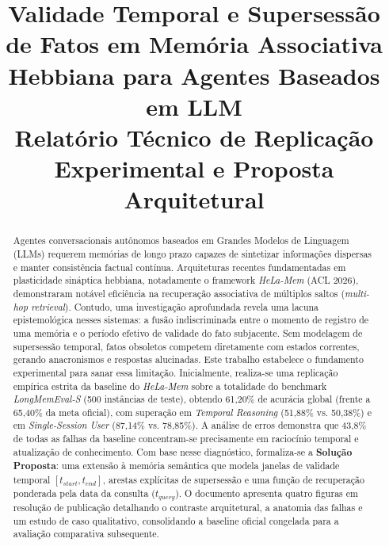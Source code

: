 \documentclass[10pt,conference,twocolumn]{IEEEtran}
\begin{document}
\title{Validade Temporal e Supersessão de Fatos em Memória Associativa Hebbiana para Agentes Baseados em LLM\\
\large Relatório Técnico de Replicação Experimental e Proposta Arquitetural}

\author{
}

\maketitle

\begin{abstract}
Agentes conversacionais autônomos baseados em Grandes Modelos de Linguagem (LLMs) requerem memórias de longo prazo capazes de sintetizar informações dispersas e manter consistência factual contínua. Arquiteturas recentes fundamentadas em plasticidade sináptica hebbiana, notadamente o framework \textit{HeLa-Mem} (ACL 2026), demonstraram notável eficiência na recuperação associativa de múltiplos saltos (\textit{multi-hop retrieval}). Contudo, uma investigação aprofundada revela uma lacuna epistemológica nesses sistemas: a fusão indiscriminada entre o momento de registro de uma memória e o período efetivo de validade do fato subjacente. Sem modelagem de supersessão temporal, fatos obsoletos competem diretamente com estados correntes, gerando anacronismos e respostas alucinadas. Este trabalho estabelece o fundamento experimental para sanar essa limitação. Inicialmente, realiza-se uma replicação empírica estrita da baseline do \textit{HeLa-Mem} sobre a totalidade do benchmark \textit{LongMemEval-S} (500 instâncias de teste), obtendo 61,20\% de acurácia global (frente a 65,40\% da meta oficial), com superação em \textit{Temporal Reasoning} (51,88\% vs. 50,38\%) e em \textit{Single-Session User} (87,14\% vs. 78,85\%). A análise de erros demonstra que 43,8\% de todas as falhas da baseline concentram-se precisamente em raciocínio temporal e atualização de conhecimento. Com base nesse diagnóstico, formaliza-se a \textbf{Solução Proposta}: uma extensão à memória semântica que modela janelas de validade temporal $[t_{start}, t_{end}]$, arestas explícitas de supersessão e uma função de recuperação ponderada pela data da consulta ($t_{query}$). O documento apresenta quatro figuras em resolução de publicação detalhando o contraste arquitetural, a anatomia das falhas e um estudo de caso qualitativo, consolidando a baseline oficial congelada para a avaliação comparativa subsequente.
\end{abstract}
\end{document}
